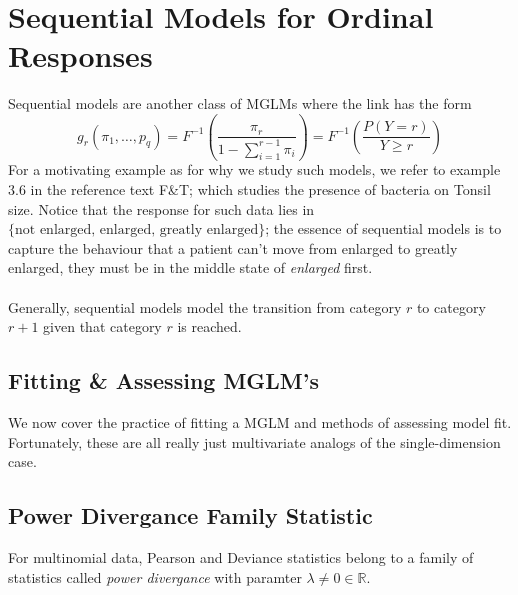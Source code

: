 
\section{Sequential Models for Ordinal Responses}

Sequential models are another class of MGLMs where the link has the form 
$$g_r(\pi_1, \dots, p_q) = F^{-1}\left(\frac{\pi_r}{1 - \sum_{i=1}^{r-1}\pi_i}\right) = F^{-1}\left(\frac{P(Y=r)}{Y\geq r}\right)$$
For a motivating example as for why we study such models, we refer to example 3.6 in the reference text F\&T; which studies the presence of bacteria on Tonsil size. Notice that the response for such data lies in $\{\text{not enlarged, enlarged, greatly enlarged}\}$; the essence of sequential models is to capture the behaviour that a patient can't move from enlarged to greatly enlarged, they must be in the middle state of \textit{enlarged} first. \\
\\
Generally, sequential models model the transition from category $r$ to category $r+1$ given that category $r$ is reached.


\subsection{Fitting \& Assessing MGLM's}

We now cover the practice of fitting a MGLM and methods of assessing model fit. Fortunately, these are all really just multivariate analogs of the single-dimension case. 

\subsection{Power Divergance Family Statistic}
For multinomial data, Pearson and Deviance statistics belong to a family of statistics called \textit{power divergance} with paramter $\lambda\neq0\in\mathbb{R}$.

